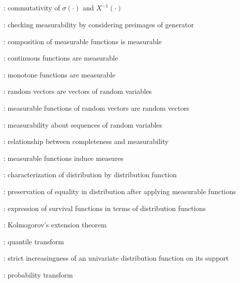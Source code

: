 \subsection*{}
\item {}: commutativity of \(\sigma(\cdot)\) and \(X^{-1}(\cdot)\)
\item {}: checking measurability by
considering preimages of generator
\item {}: composition of measurable functions is
measurable
\item {}: continuous functions are measurable
\item {}: monotone functions are measurable
\item {}: random vectors are vectors of random variables
\item {}: measurable functions of random vectors are random vectors
\item {}: measurability about sequences of random variables
\item {}: relationship between completeness and
measurability
\item {}: measurable functions induce measures
\item {}: characterization of distribution by distribution function
\item {}: preservation of equality in distribution after applying
measurable functions
\item {}: expression of survival functions in terms of distribution functions
\item {}: Kolmogorov's extension theorem
\item {}: quantile transform
\item {}: strict increasingness of an univariate distribution function on its support
\item {}: probability transform

